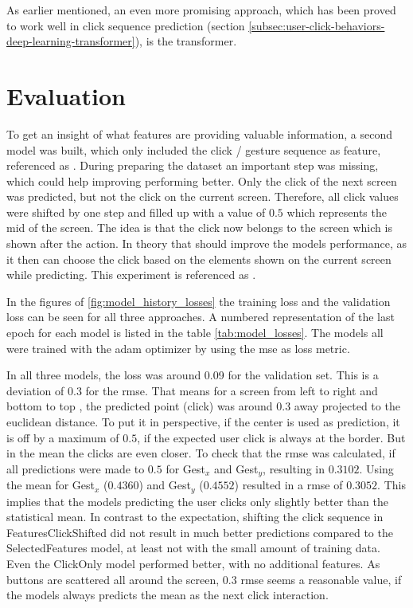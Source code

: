 As earlier mentioned, an even more promising approach, which has been proved to work well in click sequence prediction (section \ref{subsec:user-click-behaviors-deep-learning-transformer}), is the transformer.

\section{Evaluation}

To get an insight of what features are providing valuable information, a second model was built, which only included the click / gesture sequence as feature, referenced as .
During preparing the dataset an important step was missing, which could help improving performing better.
Only the click of the next screen was predicted, but not the click on the current screen.
Therefore, all click values were shifted by one step and filled up with a value of $0.5$ which represents the mid of the screen.
The idea is that the click now belongs to the screen which is shown after the action.
In theory that should improve the models performance, as it then can choose the click based on the elements shown on the current screen while predicting.
This experiment is referenced as .

In the figures of \ref{fig:model_history_losses} the training loss and the validation loss can be seen for all three approaches.
A numbered representation of the last epoch for each model is listed in the table \ref{tab:model_losses}.
The models all were trained with the \gls{adam} optimizer by using the \gls{mse} as loss metric.

In all three models, the loss was around 0.09 for the validation set.
This is a deviation of 0.3 for the \gls{rmse}.
That means for a screen from left  to right  and bottom  to top , the predicted point (click) was around $0.3$ away projected to the euclidean distance.
To put it in perspective, if the center is used as prediction, it is off by a maximum of $0.5$, if the expected user click is always at the border.
But in the mean the clicks are even closer.
To check that the \gls{rmse} was calculated, if all predictions were made to $0.5$ for Gest$_x$ and Gest$_y$, resulting in $0.3102$.
Using the mean for Gest$_x$ ($0.4360$) and Gest$_y$ ($0.4552$) resulted in a \gls{rmse} of $0.3052$.
This implies that the models predicting the user clicks only slightly better than the statistical mean.
In contrast to the expectation, shifting the click sequence in FeaturesClickShifted did not result in much better predictions compared to the SelectedFeatures model, at least not with the small amount of training data.
Even the ClickOnly model performed better, with no additional features.
As buttons are scattered all around the screen, $0.3$ \gls{rmse} seems a reasonable value, if the models always predicts the mean as the next click interaction.

